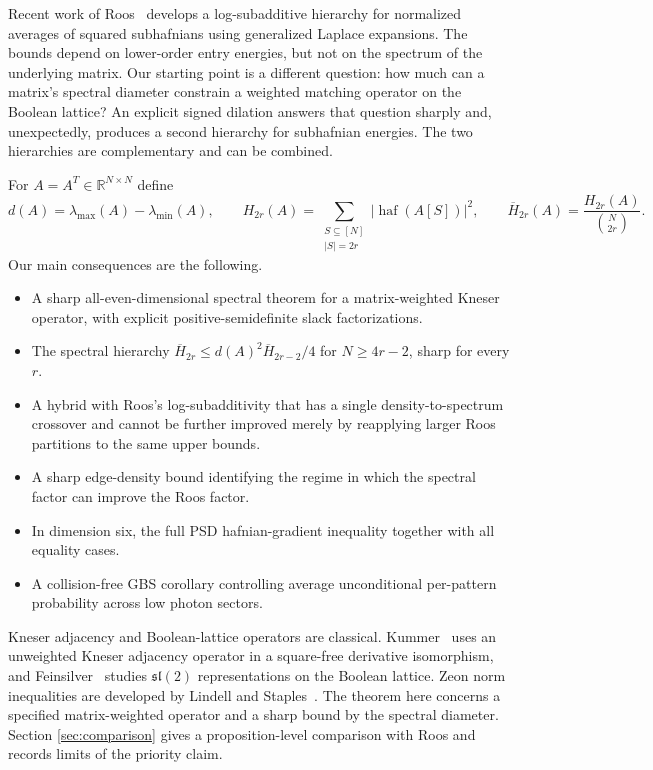 \documentclass[11pt]{article}
\theoremstyle{remark}\newtheorem{remark}[theorem]{Remark}
\DeclareMathOperator{\haf}{haf}\DeclareMathOperator{\tr}{tr}
\newcommand{\R}{\mathbb R}\newcommand{\op}{\mathrm{op}}
\newcommand{\Hbar}{\overline H}
\begin{document}
Recent work of Roos~\cite{roos} develops a log-subadditive hierarchy for
normalized averages of squared subhafnians using generalized Laplace
expansions.  The bounds depend on lower-order entry energies, but not on the
spectrum of the underlying matrix.  Our starting point is a different
question: how much can a matrix's spectral diameter constrain a weighted
matching operator on the Boolean lattice?  An explicit signed dilation answers
that question sharply and, unexpectedly, produces a second hierarchy for
subhafnian energies.  The two hierarchies are complementary and can be combined.

For $A=A^T\in\R^{N\times N}$ define
\[
d(A)=\lambda_{\max}(A)-\lambda_{\min}(A),\qquad
H_{2r}(A)=\sum_{\substack{S\subseteq[N]\\|S|=2r}}|\haf(A[S])|^2,
\qquad
\Hbar_{2r}(A)=\frac{H_{2r}(A)}{\binom N{2r}}.
\]
Our main consequences are the following.
\begin{itemize}
\item A sharp all-even-dimensional spectral theorem for a matrix-weighted
Kneser operator, with explicit positive-semidefinite slack factorizations.
\item The spectral hierarchy
$\Hbar_{2r}\le d(A)^2\Hbar_{2r-2}/4$ for $N\ge4r-2$, sharp for every $r$.
\item A hybrid with Roos's log-subadditivity that has a single density-to-spectrum
crossover and cannot be further improved merely by reapplying larger Roos
partitions to the same upper bounds.
\item A sharp edge-density bound identifying the regime in which the spectral
factor can improve the Roos factor.
\item In dimension six, the full PSD hafnian-gradient inequality together with
all equality cases.
\item A collision-free GBS corollary controlling average unconditional
per-pattern probability across low photon sectors.
\end{itemize}

Kneser adjacency and Boolean-lattice operators are classical.  Kummer~\cite{kummer}
uses an unweighted Kneser adjacency operator in a square-free derivative
isomorphism, and Feinsilver~\cite{feinsilver} studies $\mathfrak{sl}(2)$
representations on the Boolean lattice.  Zeon norm inequalities are developed
by Lindell and Staples~\cite{lindell}.  The theorem here concerns a specified
matrix-weighted operator and a sharp bound by the spectral diameter.  Section
\ref{sec:comparison} gives a proposition-level comparison with Roos and records
limits of the priority claim.
\end{document}
